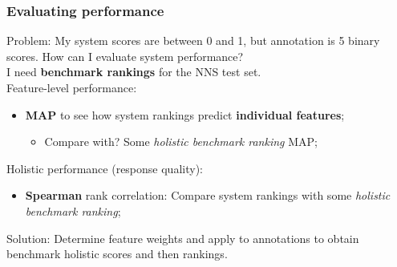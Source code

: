 \documentclass[xcolor={dvipsnames}]{beamer}
\begin{document}
\begin{frame}
\frametitle{Evaluating performance}

Problem: My system scores are between 0 and 1, but annotation is 5 binary scores. How can I evaluate system performance? \\

\vspace{1em}
\pause
I need \textbf{benchmark rankings} for the NNS test set. \\

\pause
\vspace{1em}
Feature-level performance:
\begin{itemize}
\pause
\item \textbf{MAP} to see how system rankings predict \textbf{individual features};
\begin{itemize}
\pause
\item Compare with? Some \textit{holistic benchmark ranking} MAP;
\end{itemize}
\end{itemize}

\vspace{.3em}
\pause
Holistic performance (response quality):
\begin{itemize}
\pause
\item \textbf{Spearman} rank correlation: Compare system rankings with some \textit{holistic benchmark ranking};
\end{itemize}

\pause
\vspace{1em}
Solution: Determine feature weights and apply to annotations to obtain benchmark holistic scores and then rankings. \\
\end{frame}
\end{document}
